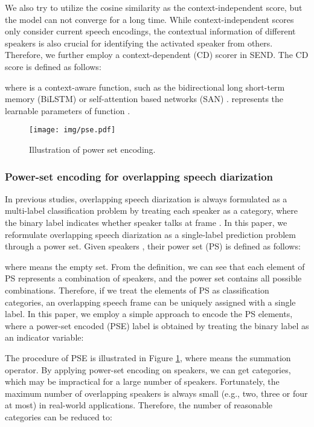 \documentclass[a4paper]{article}
\begin{document}
We also try to utilize the cosine similarity as the context-independent score, but the model can not converge for a long time.
While context-independent scores only consider current speech encodings, the contextual information of different speakers is also crucial for identifying the activated speaker from others.
Therefore, we further employ a context-dependent (CD) scorer in SEND. The CD score  is defined as follows:

where  is a context-aware function, such as the bidirectional long short-term memory (BiLSTM) \cite{hochreiter1997long} or self-attention based networks (SAN) \cite{VaswaniSPUJGKP17}.
 represents the learnable parameters of function .
\begin{figure}[t!]
	\centering
	\texttt{[image: img/pse.pdf]}
	\caption{Illustration of power set encoding.}
	\label{fig:pse}
\end{figure}
\subsubsection{Power-set encoding for overlapping speech diarization}
In previous studies, overlapping speech diarization is always formulated as a multi-label classification problem by treating each speaker as a category, where the binary label  indicates whether speaker  talks at frame .
In this paper, we reformulate overlapping speech diarization as a single-label prediction problem through a power set.
Given  speakers , their power set (PS) is defined as follows:

where  means the empty set. 
From the definition, we can see that each element of PS represents a combination of speakers, and the power set contains all possible combinations. 
Therefore, if we treat the elements of PS as classification categories, an overlapping speech frame can be uniquely assigned with a single label.
In this paper, we employ a simple approach to encode the PS elements, where a power-set encoded (PSE) label  is obtained by treating the binary label  as an indicator variable:

The procedure of PSE is illustrated in Figure \ref{fig:pse}, where  means the summation operator.
By applying power-set encoding on  speakers, we can get  categories, which may be impractical for a large number of speakers. 
Fortunately, the maximum number of overlapping speakers  is always small (e.g., two, three or four at most) in real-world applications. Therefore, the number of reasonable categories can be reduced to:
\end{document}
